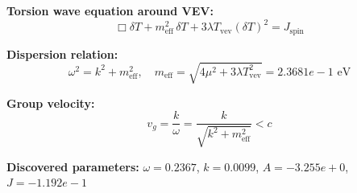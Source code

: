 
\textbf{Torsion wave equation around VEV:}
\begin{equation}
  \Box \delta T + m_{\text{eff}}^2 \, \delta T + 3\lambda T_{\text{vev}} (\delta T)^2 = J_{\text{spin}}
\end{equation}

\textbf{Dispersion relation:}
\begin{equation}
  \omega^2 = k^2 + m_{\text{eff}}^2, \quad
  m_{\text{eff}} = \sqrt{4\mu^2 + 3\lambda T_{\text{vev}}^2} = 2.3681e-1 \text{ eV}
\end{equation}

\textbf{Group velocity:}
\begin{equation}
  v_g = \frac{k}{\omega} = \frac{k}{\sqrt{k^2 + m_{\text{eff}}^2}} < c
\end{equation}

\textbf{Discovered parameters:}
$\omega = 0.2367$, \quad
$k = 0.0099$, \quad
$A = -3.255e+0$, \quad
$J = -1.192e-1$